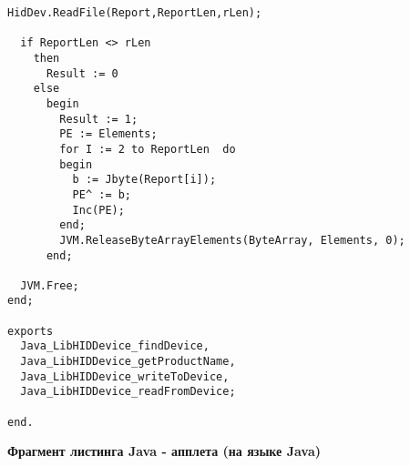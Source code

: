 {\begin{lstlisting}[language=Delphi]
  HidDev.ReadFile(Report,ReportLen,rLen);

  if ReportLen <> rLen
    then
      Result := 0
    else
      begin
        Result := 1;
        PE := Elements;
        for I := 2 to ReportLen  do
        begin
          b := Jbyte(Report[i]);
          PE^ := b;
          Inc(PE);
        end;
        JVM.ReleaseByteArrayElements(ByteArray, Elements, 0);
      end;

  JVM.Free;
end;

exports
  Java_LibHIDDevice_findDevice,
  Java_LibHIDDevice_getProductName,
  Java_LibHIDDevice_writeToDevice,
  Java_LibHIDDevice_readFromDevice;

end.

\end{lstlisting}}

\textbf{Фрагмент листинга Java - апплета (на языке Java)}
